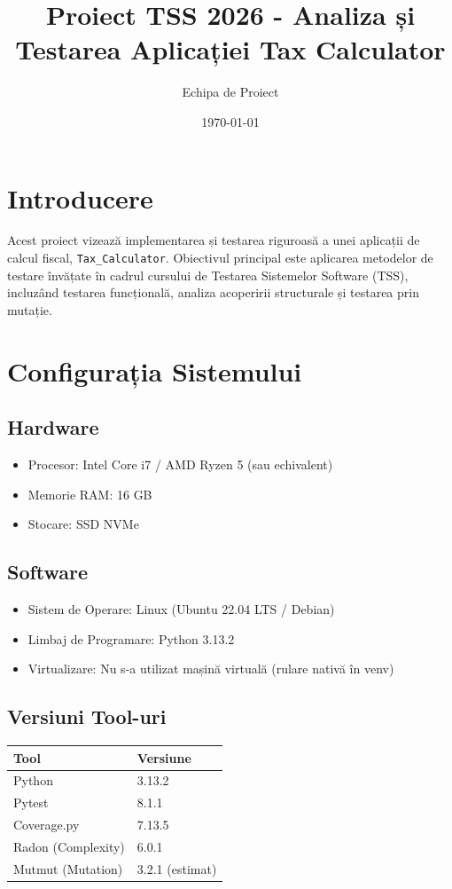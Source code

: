 \documentclass[12pt,a4paper]{article}
\title{Proiect TSS 2026 - Analiza și Testarea Aplicației Tax Calculator}
\author{Echipa de Proiect}
\date{\today}
\begin{document}
\maketitle
\tableofcontents
\newpage

\section{Introducere}
Acest proiect vizează implementarea și testarea riguroasă a unei aplicații de calcul fiscal, \texttt{Tax\_Calculator}. Obiectivul principal este aplicarea metodelor de testare învățate în cadrul cursului de Testarea Sistemelor Software (TSS), incluzând testarea funcțională, analiza acoperirii structurale și testarea prin mutație.

\section{Configurația Sistemului}
\subsection{Hardware}
\begin{itemize}
    \item Procesor: Intel Core i7 / AMD Ryzen 5 (sau echivalent)
    \item Memorie RAM: 16 GB
    \item Stocare: SSD NVMe
\end{itemize}

\subsection{Software}
\begin{itemize}
    \item Sistem de Operare: Linux (Ubuntu 22.04 LTS / Debian)
    \item Limbaj de Programare: Python 3.13.2
    \item Virtualizare: Nu s-a utilizat mașină virtuală (rulare nativă în venv)
\end{itemize}

\subsection{Versiuni Tool-uri}
\begin{longtable}{ll}
\toprule
\textbf{Tool} & \textbf{Versiune} \\
\midrule
Python & 3.13.2 \\
Pytest & 8.1.1 \\
Coverage.py & 7.13.5 \\
Radon (Complexity) & 6.0.1 \\
Mutmut (Mutation) & 3.2.1 (estimat) \\
\bottomrule
\end{longtable}
\end{document}
